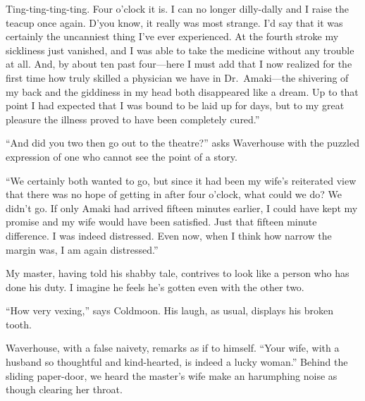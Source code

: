 \documentclass{book}
\begin{document}
Ting-ting-ting-ting. Four o'clock it is. I can no longer dilly-dally and
I raise the teacup once again. D'you know, it really was most strange.
I'd say that it was certainly the uncanniest thing I've ever
experienced. At the fourth stroke my sickliness just vanished, and I was
able to take the medicine without any trouble at all. And, by about ten
past four---here I must add that I now realized for the first time how
truly skilled a physician we have in Dr.~Amaki---the shivering of my
back and the giddiness in my head both disappeared like a dream. Up to
that point I had expected that I was bound to be laid up for days, but
to my great pleasure the illness proved to have been completely cured.''

``And did you two then go out to the theatre?'' asks Waverhouse with the
puzzled expression of one who cannot see the point of a story.

``We certainly both wanted to go, but since it had been my wife's
reiterated view that there was no hope of getting in after four o'clock,
what could we do? We didn't go. If only Amaki had arrived fifteen
minutes earlier, I could have kept my promise and my wife would have
been satisfied. Just that fifteen minute difference. I was indeed
distressed. Even now, when I think how narrow the margin was, I am again
distressed.''

My master, having told his shabby tale, contrives to look like a person
who has done his duty. I imagine he feels he's gotten even with the
other two.

``How very vexing,'' says Coldmoon. His laugh, as usual, displays his
broken tooth.

Waverhouse, with a false naivety, remarks as if to himself. ``Your wife,
with a husband so thoughtful and kind-hearted, is indeed a lucky
woman.'' Behind the sliding paper-door, we heard the master's wife make
an harumphing noise as though clearing her throat.
\end{document}
